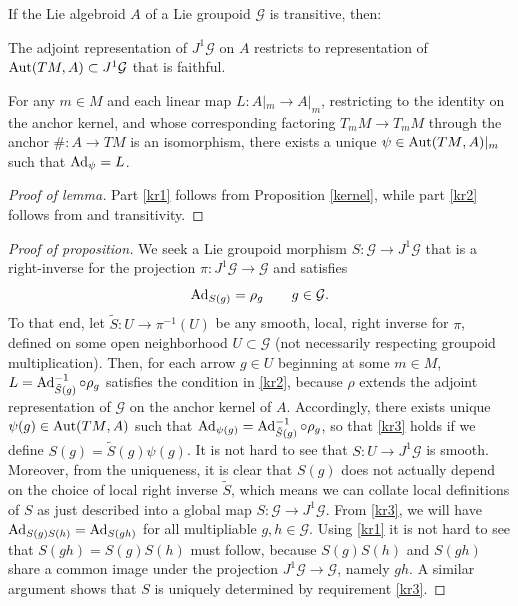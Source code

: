 \documentclass[leqno,12pt]{amsart} %
\begin{document}
\begin{lemma}
  If the Lie algebroid $A$ of a Lie groupoid ${\mathcal G} $ is transitive, then:
  \begin{conditions}
  \item The adjoint representation of $J^1 {\mathcal G} $ on $A$ restricts to
    representation of $\operatorname{Aut}(TM, A) \subset J^1 {\mathcal G} $ that is
    faithful.\label{kr1}
  \item For any $m \in M$ and each linear map $L \colon A|_m \rightarrow A|_m$,
    restricting to the identity on the anchor kernel, and whose corresponding factoring
    $T_mM \rightarrow T_mM$ through the anchor $\# \colon A \rightarrow TM$ is an
    isomorphism, there exists a unique $\psi \in \operatorname{Aut}({TM},A)|_m$ such that
    $\operatorname{Ad}_\psi = L$.\label{kr2}
  \end{conditions}
\end{lemma}
\begin{proof}[Proof of lemma]
  Part \eqref{kr1} follows from Proposition \ref{kernel}, while part \eqref{kr2} follows
  from  and transitivity.
\end{proof}
\begin{proof}[Proof of proposition]
  We seek a Lie groupoid morphism $S \colon {\mathcal G} \rightarrow J^1 {\mathcal G} $
  that is a right-inverse for the projection
  $\pi \colon J^1 {\mathcal G} \rightarrow {\mathcal G} $ and satisfies
  \begin{equation}
    \operatorname{Ad}_{S(g)} = \rho_g \qquad g \in {\mathcal G}.\label{kr3}
  \end{equation}
  To that end, let $\tilde S \colon U \rightarrow \pi^{-1}(U)$ be any smooth, local, right
inverse for $\pi $, defined on some open neighborhood $U \subset {\mathcal G}$ (not
necessarily respecting groupoid multiplication).  Then, for each arrow $g \in U$ beginning
at some $m \in M$, $L = \operatorname{Ad}_{\tilde S(g)}^{-1}\circ \rho_g $ satisfies the
condition in \eqref{kr2}, because $\rho$ extends the adjoint representation of
${\mathcal G} $ on the anchor kernel of $A$. Accordingly, there exists unique
$\psi(g) \in \operatorname{Aut}({TM},A)$ such that
$\operatorname{Ad}_{\psi(g)} =\operatorname{Ad}_{\tilde S(g)}^{-1}\circ \rho_g$, so that \eqref{kr3} holds
if we define $S(g) = \tilde S(g)\psi(g)$. It is not hard to see that
$S \colon U \rightarrow J^1 {\mathcal G} $ is smooth. Moreover, from the uniqueness, it
is clear that $S(g)$ does not actually depend on the choice of local right inverse
$\tilde S$, which means we can collate local definitions of $S$ as just described into a
global map $S \colon {\mathcal G} \rightarrow J^1 {\mathcal G} $. From \eqref{kr3}, we
will have $\operatorname{Ad}_{S(g)S(h)}=\operatorname{Ad}_{S(gh)}$ for all multipliable
$g, h \in {\mathcal G} $. Using \eqref{kr1} it is not hard to see that $S(gh)=S(g)S(h)$
must follow, because $S(g)S(h)$ and $S(gh)$ share a common image under the projection
$J^1 {\mathcal G} \rightarrow {\mathcal G}$, namely $gh$. A similar argument shows that
$S$ is uniquely determined by requirement \eqref{kr3}.

\end{proof}


\end{document}
